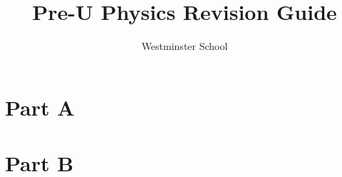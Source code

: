 \documentclass[a4paper,11pt,twoside]{memoir}
\title{Pre-U Physics Revision Guide}
\author{Westminster School}
\newcounter{spec}[chapter]
\begin{document}
\frontmatter
\begin{titlingpage}
	\maketitle
\end{titlingpage}

\tableofcontents


\mainmatter
\part*{Part A}









\part*{Part B}











\appendix



\backmatter
\end{document}
